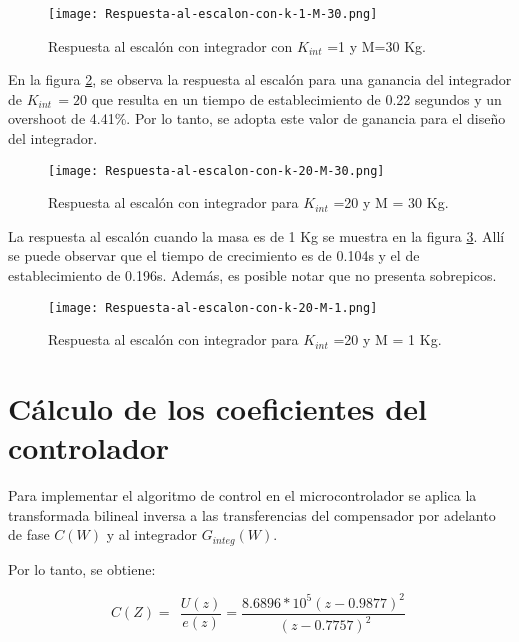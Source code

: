 \begin{figure}[H]
	\centering
	\texttt{[image: Respuesta-al-escalon-con-k-1-M-30.png]}
	\caption{Respuesta al escalón con integrador con $K_{int}$ =1 y M=30 Kg.}
	\label{fig:respuesta-al-escalon-con-k-1-M-30}
\end{figure}


\noindent En la figura \ref{fig:respuesta-al-escalon-con-k-20-M-30}, se observa la respuesta al escal\'{o}n para una ganancia del integrador de $K_{int\ }=20$ que resulta en un tiempo de establecimiento de 0.22 segundos y un overshoot de 4.41\%. Por lo tanto, se adopta este valor de ganancia para el dise\~{n}o del integrador.

\begin{figure}[H]
	\centering
	\texttt{[image: Respuesta-al-escalon-con-k-20-M-30.png]}
	\caption{Respuesta al escalón con integrador para $K_{int}$ =20 y M = 30 Kg.}
	\label{fig:respuesta-al-escalon-con-k-20-M-30}
\end{figure}


\noindent La respuesta al escal\'{o}n cuando la masa es de 1 Kg se muestra en la figura \ref{fig:respuesta-al-escalon-con-k-20-M-1}. All\'{i} se puede observar que el tiempo de crecimiento es de 0.104s y el de establecimiento de 0.196s. Adem\'{a}s, es posible notar que no presenta sobrepicos.



\begin{figure}[H]
	\centering
	\texttt{[image: Respuesta-al-escalon-con-k-20-M-1.png]}
	\caption{Respuesta al escalón con integrador para $K_{int}$ =20 y M = 1 Kg.}
	\label{fig:respuesta-al-escalon-con-k-20-M-1}
\end{figure}


\section{Cálculo de los coeficientes del controlador}

\noindent Para implementar el algoritmo de control en el microcontrolador se aplica la transformada bilineal inversa a las transferencias del compensador por adelanto de fase $C(W)$ y al integrador $G_{integ}(W)$.

\noindent Por lo tanto, se obtiene:

\begin{equation} \label{GrindEQ__5_6_} 
	C(Z)=\ \ \frac{U(z)}{e(z)}=\frac{8.6896*10^5(z-0.9877)^2}{\ (z-0.7757)^2}\  
\end{equation} 

